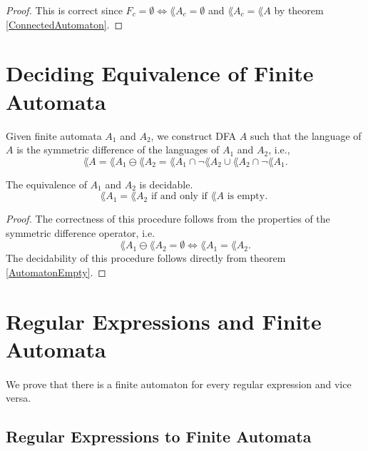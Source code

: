 \documentclass[11pt,a4paper,oneside]{book}
\begin{document}
            \begin{proof}
                This is correct since $F_c = \emptyset \Leftrightarrow \lang{A_c} = \emptyset$ and $\lang{A_c} = \lang{A}$ by theorem \ref{ConnectedAutomaton}.
            \end{proof}


        \section{Deciding Equivalence of Finite Automata}
            Given finite automata $A_1$ and $A_2$, we construct DFA $A$ such that the language of $A$ is the symmetric difference of the languages of $A_1$ and $A_2$, i.e.,
            \[ 
                \lang{A} = \lang{A_1} \ominus \lang{A_2} = \lang{A_1} \cap \neg \lang{A_2} \cup \lang{A_2} \cap \neg \lang{A_1}.
            \]
            \begin{theorem} The equivalence of $A_1$ and $A_2$ is decidable. 
                \[
                    \lang{A_1} = \lang{A_2} \mbox{ if and only if } \lang{A} \mbox{ is empty. }
                \]
            \end{theorem}
            \begin{proof}
                The correctness of this procedure follows from the properties of the symmetric difference operator, i.e.
                \[ 
                    \lang{A_1} \ominus \lang{A_2} = \emptyset \Leftrightarrow \lang{A_1} = \lang{A_2}.
                \]
                The decidability of this procedure follows directly from theorem \ref{AutomatonEmpty}.
            \end{proof}

            
        \section{Regular Expressions and Finite Automata}

            \paragraph{} 
                We prove that there is a finite automaton for every regular expression and vice versa. 

            \subsection{Regular Expressions to Finite Automata}
\end{document}

